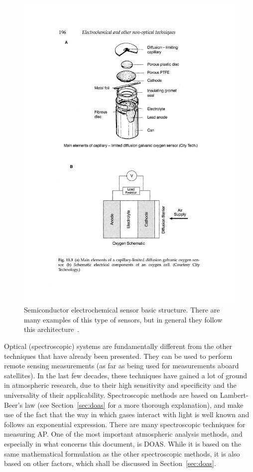 \begin{figure}[htpb]
    \centering
    \includegraphics[trim=6cm 6.2cm 4cm 16cm, clip]{img/pdf/clark_193.pdf}
    \caption{Semiconductor electrochemical sensor basic structure. There
    are many examples of this type of sensors, but in general they
    follow this architecture~\cite{Clark1997}.}
    \label{fig:semiconductor_sensor}
\end{figure}

Optical (spectroscopic) systems are fundamentally different from the
other techniques that have already been presented. They can be used to
perform remote sensing measurements (as far as being used for
measurements aboard satellites). In the last few decades, these
techniques have gained a lot of ground in atmospheric research, due to
their high sensitivity and specificity and the universality of their
applicability. Spectroscopic methods are based on Lambert-Beer's law
(see Section~\ref{sec:doas} for a more thorough explanation), and make
use of the fact that the way in which gases interact with light is well
known and follows an exponential expression. There are many
spectroscopic techniques for measuring \gls{AP}. One of the most
important atmospheric analysis methods, and especially in what concerns
this document, is \gls{DOAS}. While it is based on the same mathematical
formulation as the other spectroscopic methods, it is also based on
other factors, which shall be discussed in Section~\ref{sec:doas}.

